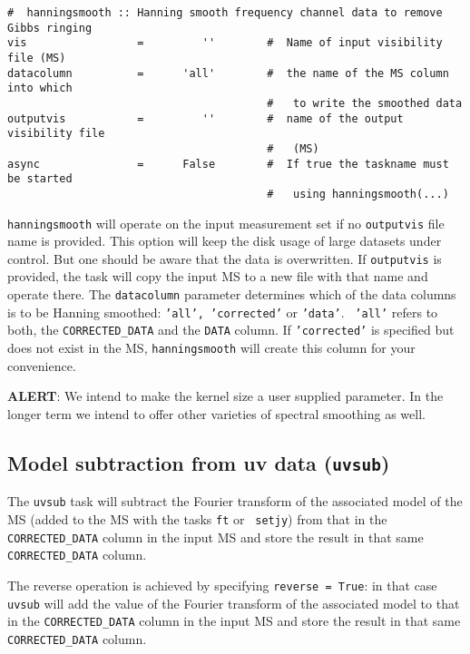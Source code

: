 {\small
\begin{verbatim}
#  hanningsmooth :: Hanning smooth frequency channel data to remove Gibbs ringing
vis                 =         ''        #  Name of input visibility file (MS)
datacolumn          =      'all'        #  the name of the MS column into which
                                        #   to write the smoothed data
outputvis           =         ''        #  name of the output visibility file
                                        #   (MS)
async               =      False        #  If true the taskname must be started
                                        #   using hanningsmooth(...)
\end{verbatim}
\normalsize

{\tt hanningsmooth} will operate on the input measurement set if no
{\tt outputvis} file name is provided. This option will keep the disk
usage of large datasets under control. But one should be aware that
the data is overwritten. If {\tt outputvis} is provided, the task will
copy the input MS to a new file with that name and operate there. The
{\tt datacolumn} parameter determines which of the data columns is to
be Hanning smoothed: {\tt 'all', 'corrected'} or {\tt 'data'}. {\tt
  'all'} refers to both, the {\tt CORRECTED\_DATA} and the {\tt DATA}
column. If {\tt 'corrected'} is specified but does not exist in the
MS, {\tt hanningsmooth} will create this column for your convenience.

{\bf ALERT}: We intend to make the kernel size a user supplied
parameter.  In the longer term we intend to offer other varieties of
spectral smoothing as well.

\subsection{Model subtraction from uv data ({\tt uvsub})}
\label{section:cal.other.uvsub}

The {\tt uvsub} task will subtract the Fourier transform of the
associated model of the MS (added to the MS with the tasks {\tt ft} or {\tt
  setjy}) from that in the {\tt
  CORRECTED\_DATA} column in the input MS and store the result in that
same {\tt CORRECTED\_DATA} column. 

The reverse operation is achieved by specifying {\tt reverse = True}:
in that case {\tt uvsub} will add the value of the Fourier transform of
the associated model to that in the {\tt CORRECTED\_DATA} column in
the input MS and store the result in that same {\tt CORRECTED\_DATA}
column.

}
